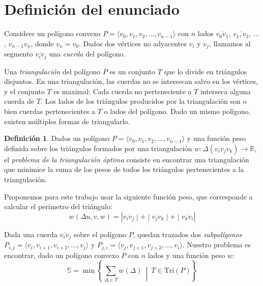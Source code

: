 \documentclass[tiny]{corsage}
\makeatletter
\newcommand{\R}{\mathbb{R}}
\newcommand{\Tri}{\text{Tri}}
\newcommand{\segment}[1]{\overline{#1}}
\theoremstyle{plain}
\theoremstyle{definition}
\newtheorem{defthm}{Definición}
\newcommand*{\@doendeq}{%
	\everypar{{\setbox\z@\lastbox}\everypar{}}%
}
\newenvironment{definition}{%
	\begin{tcolorbox}[
		left skip=0.5cm,
		right skip=0.5cm,
		left=8pt,
		right=8pt,
		top=3\parskip,
		bottom=0.25\parskip,
		colback=definition-background,
		colframe=definition-line,
		boxrule=0pt,
		leftrule=4pt,
		sharp corners=all
	]%
	\begin{defthm}%
}{%
	\end{defthm}%
	\end{tcolorbox}%
	\ignorespacesafterend\par\noindent\aftergroup\@doendeq%
}
\makeatother
\begin{document}
\section{Definición del enunciado}
	Considere un polígono convexo $P = \langle v_0, v_1, v_2, \dots, v_{n - 1} \rangle$ con $n$ lados $\segment{v_0v_1}$, $\segment{v_1,v_2}$, $\dots$, $\segment{v_{n - 1}v_n}$,  donde $v_n = v_0$.  Dados dos vértices no adyacentes $v_i$ y $v_j$, llamamos al segmento $\segment{v_iv_j}$ una \emph{cuerda} del polígono.

	Una \emph{triangulación} del polígono $P$ es un conjunto $T$ que lo divide en triángulos disjuntos.  En una triangulación, las cuerdas no se intersecan salvo en los vértices, y el conjunto $T$ es maximal:  Cada cuerda no perteneciente a $T$ interseca alguna cuerda de $T$.  Los lados de los triángulos producidos por la triangulación son o bien cuerdas pertenecientes a $T$ o lados del polígono.  Dado un mismo polígono, existen múltiples formas de triangularlo.

	\begin{definition}	
		Dados un polígono $P = \langle v_0, v_1, v_2, \dots, v_{n - 1} \rangle$ y una función peso definida sobre los triángulos formados por una triangulación $w: \Delta(v_iv_jv_k) \to \R$, el \emph{problema de la triangulación óptima} consiste en encontrar una triangulación que minimice la suma de los pesos de todos los triángulos pertenecientes a la triangulación.
		\label{def-tri}
	\end{definition}
	
	Proponemos para este trabajo usar la siguiente función peso, que corresponde a calcular el perímetro del triángulo:
	\begin{equation}
		w(\Delta{u, v, w}) = \left | \segment{v_iv_j} \middle | + \middle | \segment{v_jv_k} \middle | + \middle | \segment{v_kv_i} \right |
		\label{fn-w}
	\end{equation}

	Dada una cuerda $\segment{v_iv_j}$ sobre el polígono $P$, quedan trazados dos \emph{subpolígonos} $P_{i, j} = \langle v_i, v_{i + 1}, v_{i + 2}, \dots, v_j \rangle$ y $P_{j, i} = \langle v_j, v_{j + 1}, v_{j + 2}, \dots, v_i \rangle$.  Nuestro problema es encontrar, dado un polígono convexo $P$ con $n$ lados y una función peso $w$:
	\begin{equation}
		\mathbb{S} = \min{\left \{ \sum_{\Delta \in T}{w(\Delta)} \ \middle | \  T \in \Tri(P) \right \}}
		\label{def-sol}
	\end{equation}
\end{document}
